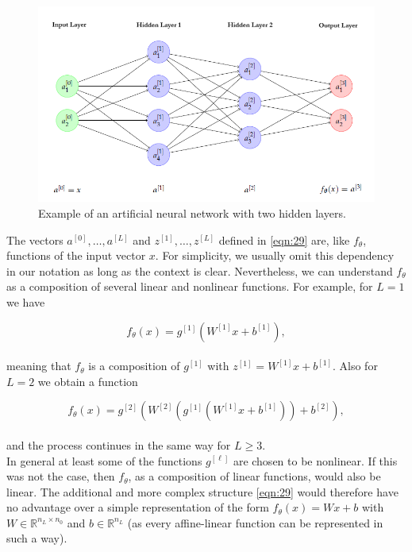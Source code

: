 \begin{figure}[h!]
    \centering
    \includegraphics[width=\textwidth]{images/figure6.png}
    \caption{Example of an artificial neural network with two hidden layers.}
    \label{fig:6}
\end{figure}

\begin{remark}[Nonlinearity]
The vectors $a^{[0]}, \ldots, a^{[L]}$ and $z^{[1]}, \ldots, z^{[L]}$ defined in \ref{eqn:29} are, like $f_{\theta}$, functions of the input vector $x$. For simplicity, we usually omit this dependency in our notation as long as the context is clear. Nevertheless, we can understand $f_{\theta}$ as a composition of several linear and nonlinear functions. For example, for $L=1$ we have

\begin{equation}
    f_{\theta}(x) = g^{[1]}(W^{[1]}x + b^{[1]}),
    \label{eqn:30}
\end{equation}\\

meaning that $f_{\theta}$ is a composition of $g^{[1]}$ with $z^{[1]} = W^{[1]}x + b^{[1]}$. Also for $L=2$ we obtain a function

\begin{equation}
    f_{\theta}(x) = g^{[2]}(W^{[2]}(g^{[1]}(W^{[1]}x + b^{[1]})) + b^{[2]}),
    \label{eqn:31}
\end{equation}\\
and the process continues in the same way for $L \geq 3$.\\

In general at least some of the functions $g^{[\ell]}$ are chosen to be nonlinear. If this was not the case, then $f_{\theta}$, as a composition of linear functions, would also be linear. The additional and more complex structure \ref{eqn:29} would therefore have no advantage over a simple representation of the form $f_{\theta}(x) = Wx + b$ with $W \in \mathbb{R}^{n_L \times n_0}$ and $b \in \mathbb{R}^{n_L}$ (as every affine-linear function can be represented in such a way).

\end{remark}

